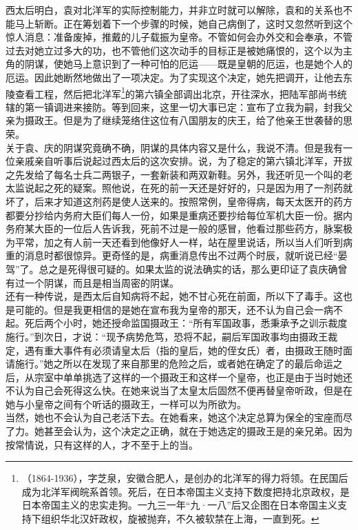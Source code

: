 西太后明白，袁对北洋军的实际控制能力，并非立时就可以解除，袁和的关系也不能马上斩断。正在筹划着下一个步骤的时候，她自己病倒了，这时又忽然听到这个惊人消息：准备废掉，推戴的儿子载振为皇帝。不管如何会办外交和会奉承，不管过去对她立过多大的功，也不管他们这次动手的目标正是被她痛恨的，这个以为主角的阴谋，使她马上意识到了一种可怕的厄运——既是皇朝的厄运，也是她个人的厄运。因此她断然地做出了一项决定。为了实现这个决定，她先把调开，让他去东陵查看工程，然后把北洋军\footnote{（1864-1936），字芝泉，安徽合肥人，是创办的北洋军的得力将领。在民国后成为北洋军阀皖系首领。死后，在日本帝国主义支持下数度把持北京政权，是日本帝国主义的忠实走狗。一九三一年“九·一八”后又企图在日本帝国主义支持下组织华北汉奸政权，旋被抛弃，不久被软禁在上海，一直到死。}的第六镇全部调出北京，开往深水，把陆军部尚书统辖的第一镇调进来接防。等到回来，这里一切大事已定：宣布了立我为嗣，封我父亲为摄政王。但是为了继续笼络住这位有八国朋友的庆王，给了他亲王世袭替的思荣。\\

关于袁、庆的阴谋究竟确不确，阴谋的具体内容又是什么，我说不清。但是我有一位亲戚亲自听事后说起过西太后的这次安排。说，为了稳定的第六镇北洋军，开拔之先发给了每名士兵二两银子，一套新装和两双新鞋。另外，我还听见一个叫的老太监说起之死的疑案。照他说，在死的前一天还是好好的，只是因为用了一剂药就坏了，后来才知道这剂药是使人送来的。按照常例，皇帝得病，每天太医开的药方都要分抄给内务府大臣们每人一份，如果是重病还要抄给每位军机大臣一份。据内务府某大臣的一位后人告诉我，死前不过是一般的感冒，他看过那些药方，脉案极为平常，加之有人前一天还看到他像好人一样，站在屋里说话，所以当人们听到病重的消息时都很惊异。更奇怪的是，病重消息传出不过两个时辰，就听说已经“晏驾”了。总之是死得很可疑的。如果太监的说法确实的话，那么更印证了袁庆确曾有过一个阴谋，而且是相当周密的阴谋。\\

还有一种传说，是西太后自知病将不起，她不甘心死在前面，所以下了毒手。这也是可能的。但是我更相信的是她在宣布我为皇帝的那天，还不认为自己会一病不起。死后两个小时，她还授命监国摄政王：“所有军国政事，悉秉承予之训示裁度施行。”到次日，才说：“现予病势危笃，恐将不起，嗣后军国政事均由摄政王裁定，遇有重大事件有必须请皇太后（指的皇后，她的侄女氏）者，由摄政王随时面请施行。”她之所以在发现了来自那里的危险之后，或者她在确定了的最后命运之后，从宗室中单单挑选了这样的一个摄政王和这样一个皇帝，也正是由于当时她还不认为自己会死得这么快。在她来说当了太皇太后固然不便再替皇帝听政，但是在她与小皇帝之间有个听话的摄政王，一样可以为所欲为。\\

当然，她也不会认为自己老活下去。在她看来，她这个决定总算为保全的宝座而尽了力。她甚至会认为，这个决定之正确，就在于她选定的摄政王是的亲兄弟。因为按常情说，只有这样的人，才不至于上的当。
